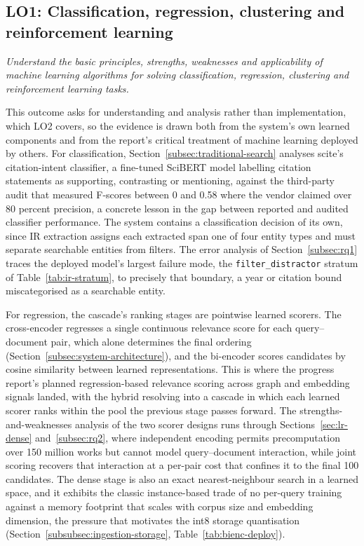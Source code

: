 \subsection{LO1: Classification, regression, clustering and reinforcement learning}
\textit{Understand the basic principles, strengths, weaknesses and
applicability of machine learning algorithms for solving classification,
regression, clustering and reinforcement learning tasks.}

This outcome asks for understanding and analysis rather than
implementation, which LO2 covers, so the evidence is drawn both from the
system's own learned components and from the report's critical treatment
of machine learning deployed by others. For classification,
Section~\ref{subsec:traditional-search} analyses scite's citation-intent classifier,
a fine-tuned SciBERT model labelling citation statements as supporting,
contrasting or mentioning, against the third-party audit that measured
F-scores between 0 and 0.58 where the vendor claimed over 80 percent
precision, a concrete lesson in the gap between reported and audited
classifier performance. The system contains a classification decision of
its own, since IR extraction assigns each extracted span one of four
entity types and must separate searchable entities from filters. The
error analysis of Section~\ref{subsec:rq1} traces the deployed model's
largest failure mode, the \texttt{filter\_distractor} stratum of
Table~\ref{tab:ir-stratum}, to precisely that boundary, a year or citation
bound miscategorised as a searchable entity.

For regression, the cascade's ranking stages are pointwise learned
scorers. The cross-encoder regresses a single continuous relevance score
for each query--document pair, which alone determines the final ordering
(Section~\ref{subsec:system-architecture}), and the bi-encoder scores candidates by
cosine similarity between learned representations. This is where the
progress report's planned regression-based relevance scoring across graph
and embedding signals landed, with the hybrid resolving into a cascade in
which each learned scorer ranks within the pool the previous stage passes
forward. The strengths-and-weaknesses analysis of the two scorer designs
runs through Sections~\ref{sec:lr-dense} and~\ref{subsec:rq2}, where
independent encoding permits precomputation over 150 million works but
cannot model query--document interaction, while joint scoring recovers
that interaction at a per-pair cost that confines it to the final 100
candidates. The dense stage is also an exact nearest-neighbour search in
a learned space, and it exhibits the classic instance-based trade of no
per-query training against a memory footprint that scales with corpus
size and embedding dimension, the pressure that motivates the int8
storage quantisation (Section~\ref{subsubsec:ingestion-storage},
Table~\ref{tab:bienc-deploy}).

